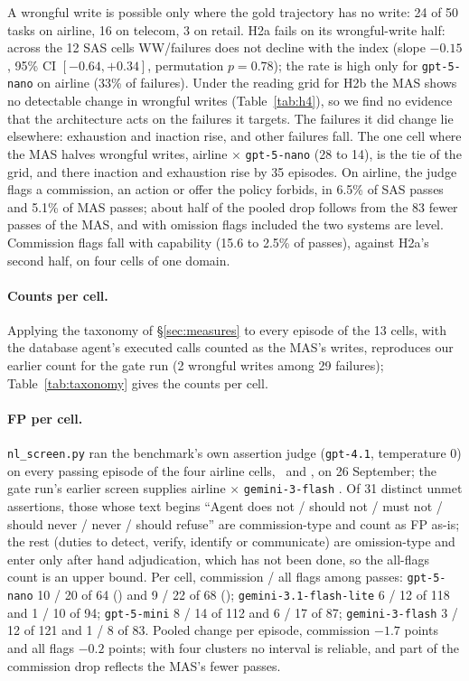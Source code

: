A wrongful write is possible only where the gold trajectory has no write: 24 of 50 tasks on airline, 16 on telecom, 3 on retail. H2a fails on its wrongful-write half: across the 12 SAS cells WW/failures does not decline with the index (slope $-0.15$, 95\% CI $[-0.64, +0.34]$, permutation $p = 0.78$); the rate is high only for \texttt{gpt-5-nano} on airline (33\% of failures). Under the reading grid for H2b the MAS shows no detectable change in wrongful writes (Table~\ref{tab:h4}), so we find no evidence that the architecture acts on the failures it targets. The failures it did change lie elsewhere: exhaustion and inaction rise, and other failures fall. The one cell where the MAS halves wrongful writes, airline $\times$ \texttt{gpt-5-nano} (28 to 14), is the tie of the grid, and there inaction and exhaustion rise by 35 episodes. On airline, the judge flags a commission, an action or offer the policy forbids, in 6.5\% of SAS passes and 5.1\% of MAS passes; about half of the pooled drop follows from the 83 fewer passes of the MAS, and with omission flags included the two systems are level. Commission flags fall with capability (15.6 to 2.5\% of passes), against H2a's second half, on four cells of one domain.

\paragraph{Counts per cell.} Applying the taxonomy of \S\ref{sec:measures} to every episode of the 13 cells, with the database agent's executed calls counted as the MAS's writes, reproduces our earlier count for the gate run (2 wrongful writes among 29 failures); Table~\ref{tab:taxonomy} gives the counts per cell.

\paragraph{FP per cell.} \texttt{nl\_screen.py} ran the benchmark's own assertion judge (\texttt{gpt-4.1}, temperature 0) on every passing episode of the four airline cells, \Sone\ and \Mone, on 26 September; the gate run's earlier screen supplies airline $\times$ \texttt{gemini-3-flash} \Sone. Of 31 distinct unmet assertions, those whose text begins ``Agent does not / should not / must not / should never / never / should refuse'' are commission-type and count as FP as-is; the rest (duties to detect, verify, identify or communicate) are omission-type and enter only after hand adjudication, which has not been done, so the all-flags count is an upper bound. Per cell, commission / all flags among passes: \texttt{gpt-5-nano} 10 / 20 of 64 (\Sone) and 9 / 22 of 68 (\Mone); \texttt{gemini-3.1-flash-lite} 6 / 12 of 118 and 1 / 10 of 94; \texttt{gpt-5-mini} 8 / 14 of 112 and 6 / 17 of 87; \texttt{gemini-3-flash} 3 / 12 of 121 and 1 / 8 of 83. Pooled change per episode, commission $-1.7$ points and all flags $-0.2$ points; with four clusters no interval is reliable, and part of the commission drop reflects the MAS's fewer passes.

